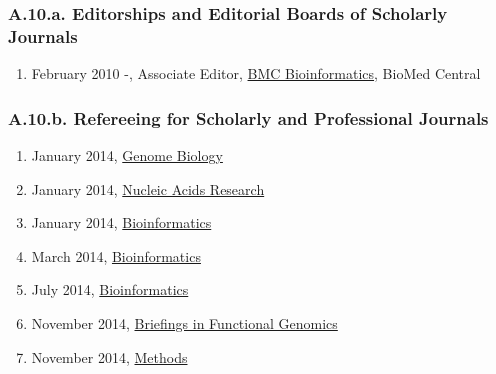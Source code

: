 
\subsubsection*{A.10.a. Editorships and Editorial Boards of Scholarly Journals}


\begin{enumerate}
  \item February 2010 -, Associate Editor, \underline{BMC Bioinformatics}, BioMed Central
\end{enumerate}

\subsubsection*{A.10.b. Refereeing for Scholarly and Professional Journals}
\begin{enumerate} 
  \item January 2014, \underline{Genome Biology}
  \item January 2014, \underline{Nucleic Acids Research}
  \item January 2014, \underline{Bioinformatics}
  \item March 2014, \underline{Bioinformatics}
  \item July 2014, \underline{Bioinformatics}
  \item November 2014, \underline{Briefings in Functional Genomics}
  \item November 2014, \underline{Methods}
\end{enumerate}

